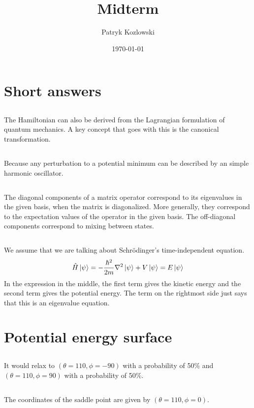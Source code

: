 \documentclass[12pt]{article}
\author{Patryk Kozlowski}
\title{Midterm}
\date{\today}
\begin{document}
\maketitle
\section{Short answers}
\subsection{}
The Hamiltonian can also be derived from the Lagrangian formulation of quantum mechanics. A key concept that goes with this is the canonical transformation.
\subsection{}
Because any perturbation to a potential minimum can be described by an simple harmonic oscillator.
\subsection{}
The diagonal components of a matrix operator correspond to its eigenvalues in the given basis, when the matrix is diagonalized. More generally, they correspond to the expectation values of the operator in the given basis. The off-diagonal components correspond to mixing between states.
\subsection{}
We assume that we are talking about Schrödinger's time-independent equation.
\begin{equation}
    \hat{H}\ket{\psi} = -\frac{\hbar^2}{2m}\nabla^2\ket{\psi} + V\ket{\psi} = E\ket{\psi}
\end{equation}
In the expression in the middle, the first term gives the kinetic energy and the second term gives the potential energy. The term on the rightmost side just says that this is an eigenvalue equation.
\section{Potential energy surface}
\subsection{}
It would relax to $(\theta =110, \phi = -90)$ with a probability of 50\% and $(\theta = 110, \phi = 90)$ with a probability of 50\%.
\subsection{}
The coordinates of the saddle point are given by $(\theta = 110, \phi = 0)$.
\end{document}
